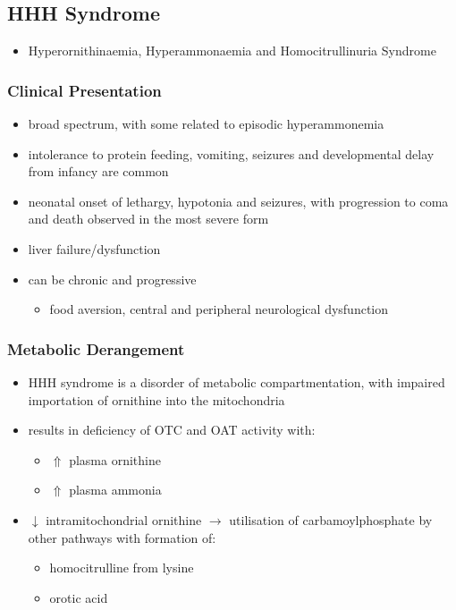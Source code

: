 \documentclass{scrartcl}
\begin{document}
\subsection{HHH Syndrome}
\label{sec:orgaede690}
\begin{itemize}
\item Hyperornithinaemia, Hyperammonaemia and Homocitrullinuria Syndrome
\end{itemize}
\subsubsection{Clinical Presentation}
\label{sec:orgf48ea7b}
\begin{itemize}
\item broad spectrum, with some related to episodic hyperammonemia
\item intolerance to protein feeding, vomiting, seizures and developmental
delay from infancy are common
\item neonatal onset of lethargy, hypotonia and seizures, with progression
to coma and death observed in the most severe form
\item liver failure/dysfunction
\item can be chronic and progressive
\begin{itemize}
\item food aversion, central and peripheral neurological dysfunction
\end{itemize}
\end{itemize}

\subsubsection{Metabolic Derangement}
\label{sec:org2cf9678}
\begin{itemize}
\item HHH syndrome is a disorder of metabolic compartmentation, with
impaired importation of ornithine into the mitochondria
\item results in deficiency of OTC and OAT activity with:
\begin{itemize}
\item \(\Uparrow\) plasma ornithine
\item \(\Uparrow\) plasma ammonia
\end{itemize}
\item \(\downarrow\) intramitochondrial ornithine \(\to\) utilisation of
carbamoylphosphate by other pathways with formation of:
\begin{itemize}
\item homocitrulline from lysine
\item orotic acid
\end{itemize}
\end{itemize}
\end{document}
